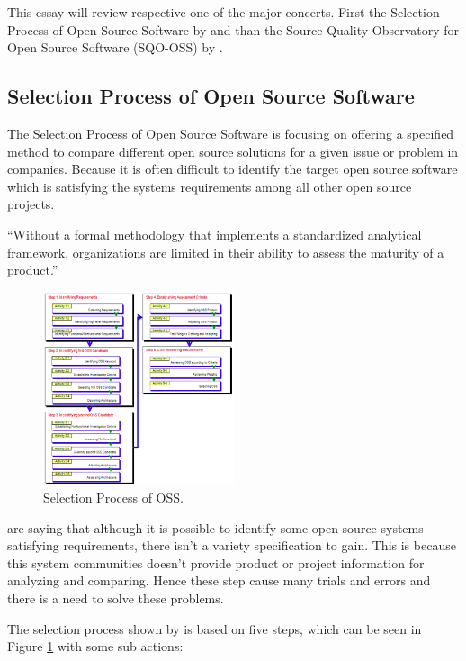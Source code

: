 \documentclass[DIV=calc,paper=a4,fontsize=9pt,twocolumn]{scrartcl}
\begin{document}
This essay will review respective one of the major concerts. First the Selection Process of Open Source Software by \citet{lee2007study} and than the Source Quality Observatory for Open Source Software (SQO-OSS) by \citet{samoladas2008sqo}.

\subsection{Selection Process of Open Source Software}

The Selection Process of Open Source Software is focusing on offering a specified method to compare different open source solutions for a given issue or problem in companies. Because it is often difficult to identify the target open source software which is satisfying the systems requirements among all other open source projects. \citep{lee2007study}

\enquote{Without a formal methodology that implements a standardized analytical framework, organizations are limited in their ability to assess the maturity of a product.} \citep{golden08}

\begin{figure}[ht]
    \includegraphics[width=0.5\textwidth ]{img/selectionprocess.png}{}
    \centering
    \caption{Selection Process of OSS. \citet{lee2007study}}\label{fig:selection-process.png}
\end{figure}


\citet{lee2007study} are saying that although it is possible to identify some open source systems satisfying requirements, there isn't a variety specification to gain. This is because this system communities doesn't provide product or project information for analyzing and comparing. Hence these step cause many trials and errors and there is a need to solve these problems.


The selection process shown by \citet{lee2007study} is based on five steps, which can be seen in Figure \ref{fig:selection-process.png} with some sub actions:
\end{document}
